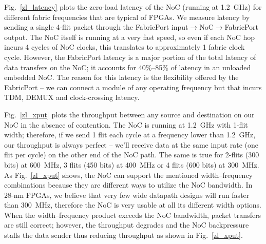 Fig.~\ref{zl_latency} plots the zero-load latency of the NoC (running at 1.2~GHz) for different fabric frequencies that are typical of FPGAs.
We measure latency by sending a single 4-flit packet through the FabricPort input$\rightarrow$NoC$\rightarrow$FabricPort output.
The NoC itself is running at a very fast speed, so even if each NoC hop incurs 4 cycles of NoC clocks, this translates to approximately 1 fabric clock cycle.
However, the FabricPort latency is a major portion of the total latency of data transfers on the NoC; it accounts for 40\%--85\% of latency in an unloaded embedded NoC.
The reason for this latency is the flexibility offered by the FabricPort -- we can connect a module of any operating frequency but that incurs TDM, DEMUX and clock-crossing latency.

%
%

Fig.~\ref{zl_xput} plots the throughput between any source and destination on our NoC in the absence of contention.
The NoC is running at 1.2~GHz with 1-flit width; therefore, if we send 1 flit each cycle at a frequency lower than 1.2~GHz, our throughput is always perfect -- we'll receive data at the same input rate (one flit per cycle) on the other end of the NoC path.
The same is true for 2-flits (300 bits) at 600~MHz, 3 flits (450 bits) at 400~MHz or 4 flits (600 bits) at 300~MHz.
As Fig.~\ref{zl_xput} shows, the NoC can support the mentioned width--frequency combinations because they are different ways to utilize the NoC bandwidth.
In 28-nm FPGAs, we believe that very few wide datapath designs will run faster than 300~MHz, therefore the NoC is very usable at all its different width options.
When the width--frequency product exceeds the NoC bandwidth, packet transfers are still correct; however, the throughput degrades and the NoC backpressure stalls the data sender thus reducing throughput as shown in Fig.~\ref{zl_xput}.

